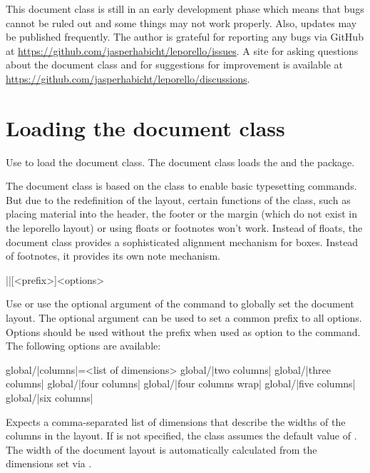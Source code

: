 \documentclass[a4paper]{article}
\begin{document}
\warning This document class is still in an early development phase which means that bugs cannot be ruled out and some things may not work properly. Also, updates may be published frequently. The author is grateful for reporting any bugs via GitHub at \url{https://github.com/jasperhabicht/leporello/issues}. A site for asking questions about the document class and for suggestions for improvement is available at \url{https://github.com/jasperhabicht/leporello/discussions}.

\section{Loading the document class}

Use  to load the document class. The document class loads the  and the  package.

The document class is based on the  class to enable basic typesetting commands. But due to the redefinition of the layout, certain functions of the  class, such as placing material into the header, the footer or the margin (which do not exist in the leporello layout) or using floats or footnotes won't work. Instead of floats, the document class provides a sophisticated alignment mechanism for boxes. Instead of footnotes, it provides its own note mechanism.

\begin{macrodef}
|\leporelloset|[<prefix>]{<options>}
\end{macrodef}
Use \macro{\leporelloset} or use the optional argument of the \macro{\documentclass} command to globally set the document layout. The optional argument can be used to set a common prefix to all options. Options should be used without the  prefix when used as option to the \macro{\documentclass} command. The following options are available:

\begin{macrodef}
global/|columns|={<list of dimensions>}
global/|two columns|
global/|three columns|
global/|four columns|
global/|four columns wrap|
global/|five columns|
global/|six columns|
\end{macrodef}
Expects a comma-separated list of dimensions that describe the widths of the columns in the layout. If  is not specified, the class assumes the default value of \macro{97mm, 100mm, 100mm}. The width of the document layout is automatically calculated from the dimensions set via .
\end{document}
